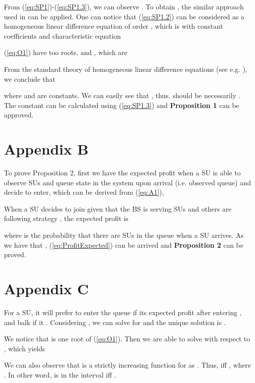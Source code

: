 \documentclass[journal]{IEEEtran}
\begin{document}
From (\ref{eq:SP1})-(\ref{eq:SP1.3}), we can observe
. To obtain , the similar
approach used in \cite[pp. 578]{Boudali} can be applied. One can notice
that (\ref{eq:SP1.2}) can be considered as a homogeneous linear
difference equation of order , which is with constant
coefficients and characteristic equation



\noindent (\ref{eq:O1}) have too roots,  and
, which are



From the standard theory of homogeneous linear difference
equations (see e.g. \cite[Sec 2.3]{Elaydi}), we conclude that



\noindent where  and  are constants. We can easily see
 that , thus,  should be necessarily . The constant  can be
calculated using (\ref{eq:SP1.3}) and \textbf{Proposition 1} can
be approved.


\section*{Appendix B}

To prove Proposition 2, first we have the expected profit when a
SU is able to observe  SUs and queue state in the system upon
arrival (i.e. observed queue) and decide to enter, which can be
derived from (\ref{eq:A1}),




When a SU decides to join given that the BS is serving SUs and
others are following strategy , the expected profit is



\noindent where  is the probability that there are  SUs in the
queue when a SU arrives. As we have that ,
(\ref{eq:ProfitExpected}) can be arrived and \textbf{Proposition
2} can be proved.

\section*{Appendix C}

For a SU, it will prefer to enter the queue if its expected profit
after entering , and balk if it .
Considering , we can solve for  and
the unique solution is . \par

We notice that  is
one root of (\ref{eq:O1}). Then we are able to solve
 with respect to , which yields



We can also observe that  is a strictly
increasing function for  as . Thus,  iff , where . In other word,  is
in the interval  iff . \par
\end{document}
